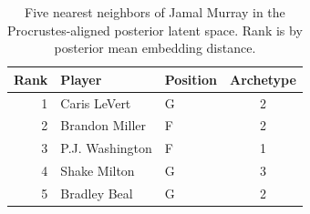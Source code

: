 \begin{table}[htbp]
  \centering\small
  \begin{tabular}{rllc}
    \toprule
    Rank & Player & Position & Archetype \\
    \midrule
    1 & Caris LeVert & G & 2 \\
    2 & Brandon Miller & F & 2 \\
    3 & P.J. Washington & F & 1 \\
    4 & Shake Milton & G & 3 \\
    5 & Bradley Beal & G & 2 \\
    \bottomrule
  \end{tabular}
  \caption{Five nearest neighbors of Jamal Murray in the Procrustes-aligned posterior latent space. Rank is by posterior mean embedding distance.}
  \label{tab:Jamal_Murray_neighbors}
\end{table}

